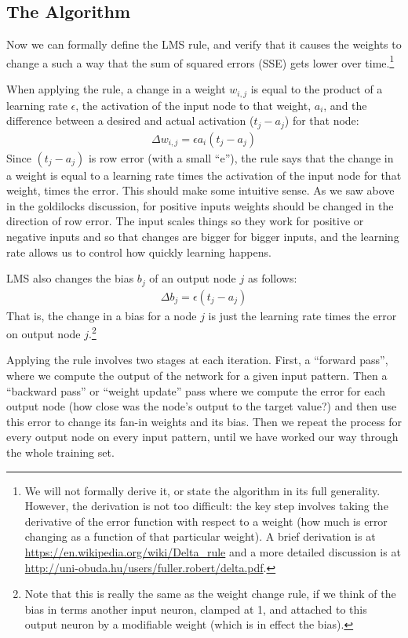 \subsection{The Algorithm}

Now we can formally define the LMS rule, and verify that it causes the weights to change a such a way that the sum of squared errors (SSE) gets lower over time.\footnote{We will not formally derive it, or state the algorithm in its full generality. However, the derivation is not too difficult: the key step involves taking the derivative of the error function with respect to a weight (how much is error changing as a function of that particular weight). A brief derivation is at \url{https://en.wikipedia.org/wiki/Delta_rule} and a more detailed discussion is at \url{http://uni-obuda.hu/users/fuller.robert/delta.pdf}.}

When applying the rule, a change in a weight $w_{i,j}$ is equal to the product of a learning rate $\epsilon$, the activation of the input node to that weight, $a_i$, and the difference between a desired and actual activation ($t_j - a_j$) for that node:
\begin{eqnarray*}
\Delta w_{i,j}  =  \epsilon a_i (t_j - a_j)
\end{eqnarray*}
Since $(t_j - a_j)$ is row error  (with a small ``e''), the rule says that the change in a weight is equal to a learning rate times the activation of the input node for that weight, times the error. This should make some intuitive sense. As we saw above in the goldilocks discussion, for positive inputs weights should be changed in the direction of row error. The input scales things so they work for positive or negative inputs and so that changes are bigger for bigger inputs, and the learning rate allows us to control how quickly learning happens. 

LMS also changes the bias $b_j$ of an output node $j$ as follows: 
\begin{eqnarray*}
\Delta b_j  =  \epsilon (t_j - a_j)
\end{eqnarray*}
That is, the change in a bias for a node $j$ is just the learning rate times the error on output node $j$.\footnote{Note that this is really the same as the weight change rule, if we think of the bias in terms another input neuron, clamped at 1, and attached to this output neuron by a modifiable weight (which is in effect the bias).}

Applying the rule involves two stages at each iteration. First, a ``forward pass'', where we compute the output of the network for a given input pattern. Then a ``backward pass'' or ``weight update'' pass where we compute the error for each output node (how close was the node's output to the target value?) and then use this error to change its fan-in weights and its bias. Then we repeat the process for every output node on every input pattern, until we have worked our way through the whole training set. 

